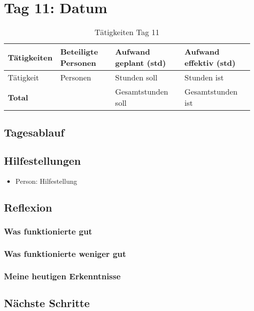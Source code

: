 \section{Tag 11: Datum}
\begin{table}[H]
    \begin{tabular}{|L{0.4\textwidth}|C{60pt}|C{60pt}|C{60pt}|}
        \hline
        \color{white}Tätigkeiten & \color{white}Beteiligte \color{white}Personen & \color{white}Aufwand geplant (std) & \color{white}Aufwand effektiv (std) \\
        \hline
         Tätigkeit & Personen & Stunden soll & Stunden ist \\
        \hline
        \textbf{Total} &  & Gesamtstunden soll & Gesamtstunden ist \\
        \hline
    \end{tabular}
    \caption{Tätigkeiten Tag 11}
\end{table}

\subsection*{Tagesablauf}

\subsection*{Hilfestellungen}
\begin{itemize}
    \item Person: Hilfestellung
\end{itemize}

\subsection*{Reflexion}

\subsubsection*{Was funktionierte gut}

\subsubsection*{Was funktionierte weniger gut}

\subsubsection*{Meine heutigen Erkenntnisse}

\subsection*{Nächste Schritte}

\pagebreak
